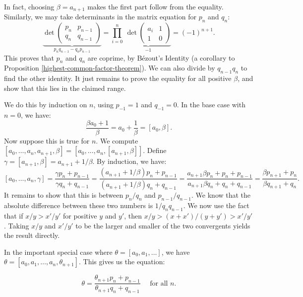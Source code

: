 \documentclass{article}
\begin{document}
\begin{prf}
    In fact, choosing $\beta = a_{n+1}$ makes the first part follow from the equality. Similarly, we may take determinants in the matrix equation for $p_n$ and $q_n$:
	\[
	\underbrace{
	\det
	\begin{pmatrix}
		p_n & p_{n-1} \\ q_n & q_{n-1}
	\end{pmatrix}
	}_{p_n q_{n-1} - q_n p_{n-1}}
	=
	\prod_{i=0}^{n}
	\ 
	\underbrace{
	\det
	\begin{pmatrix}
		a_i & 1 \\ 1 & 0
	\end{pmatrix}
	}_{-1}
	= (-1)^{n+1}.
	\]
	This proves that $p_n$ and $q_n$ are coprime, by B\'ezout's Identity (a corollary to Proposition \ref{highest-common-factor-theorem}). We can also divide by $q_{n-1}q_n$ to find the other identity. It just remains to prove the equality for all positive $\beta$, and show that this lies in the claimed range.
	
	We do this by induction on $n$, using $p_{-1} = 1$ and $q_{-1} = 0$. In the base case with $n = 0$, we have:
	\[
	\frac{\beta a_0 + 1}{\beta} = a_0 + \frac{1}{\beta} = [a_0, \beta].
	\]
	Now suppose this is true for $n$. We compute $[a_0, \dots, a_n, a_{n+1}, \beta] = [a_0, \dots, a_n, [a_{n+1}, \beta]]$. Define $\gamma = [a_{n+1}, \beta] = a_{n+1} + 1/\beta$. By induction, we have:	
	\[
	[a_0, \dots, a_n, \gamma] = \frac{\gamma p_n + p_{n-1}}{\gamma q_n + q_{n-1}}
	= \frac{(a_{n+1} + 1/\beta) p_n + p_{n-1}}{(a_{n+1} + 1/\beta) q_n + q_{n-1}}
	= \frac{a_{n+1}\beta p_n + p_n + p_{n-1}}{a_{n+1}\beta q_n + q_n + q_{n-1}}
	= \frac{\beta p_{n+1} + p_n}{\beta q_{n+1} + q_n}.
	\]
	It remains to show that this is between $p_n/q_n$ and $p_{n-1}/q_{n-1}$. We know that the absolute difference between these two numbers is $1/q_nq_{n-1}$. We now use the fact that if $x/y > x'/y'$ for positive $y$ and $y'$, then $x/y > (x+x')/(y+y') > x'/y'$. Taking $x/y$ and $x'/y'$ to be the larger and smaller of the two convergents yields the result directly.
\end{prf}

\begin{corollary}
    In the important special case where $\theta = [a_0, a_1, \dots]$, we have $\theta = [a_0, a_1, \dots, a_n, \theta_{n+1}]$. This gives us the equation:
\end{corollary}
\[
\theta = \frac{\theta_{n+1} p_n + p_{n-1}}{\theta_{n+1} q_n + q_{n-1}} \quad \text{ for all $n$.}
\]
\end{document}
